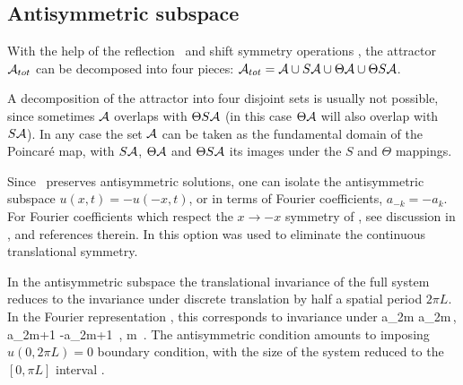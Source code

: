 \subsection{Antisymmetric subspace}
\label{s:AntisymmSubsp}

With the help of the
reflection \Refl\ and shift symmetry {\Shift}
operations
,
the  attractor ${\cal A}_{tot}$ can be decomposed into four pieces:
 ${\cal A}_{tot}={\cal A} \cup S {\cal A}  \cup \Theta {\cal A}
  \cup \Theta S {\cal A} $.

A decomposition
of the attractor into four disjoint sets
is usually not possible, since sometimes $ {\cal A}$ overlaps with
$\Theta S{\cal A} $ (in this case $\Theta  {\cal A}$ will also  overlap with
$S {\cal A} $).
In any case  the set $ {\cal A}$ can be taken as
the fundamental
domain of the Poincar{\'e} map, with $S  {\cal A} $,
$\Theta  {\cal A} $ and $\Theta S  {\cal A} $ its images under the
$S$ and $\Theta$ mappings.



Since \KSe\ preserves
antisymmetric solutions, one can isolate the antisymmetric
subspace
$u(x,t)=-u(-x,t)$, or in terms of Fourier coefficients,
$a_{-k}= - a_k$.
For Fourier coefficients which respect the $x \to -x$ symmetry of
\KSe, see discussion in ,
and references therein.
In 
this option was used to eliminate
the continuous translational symmetry.

In the antisymmetric subspace the translational
invariance of the full system reduces
to the invariance under discrete
translation by half a spatial period $2\pi L$.
In the Fourier representation ,
this corresponds to invariance under
\beq
a_{2m} \to a_{2m}\,, a_{2m+1} \to -a_{2m+1}
\,, m \in {}
\,.
The antisymmetric condition amounts to imposing
$u(0,2\pi L)=0$ boundary condition, with
the size of the system reduced to
the $[0, \pi L]$ interval
.

